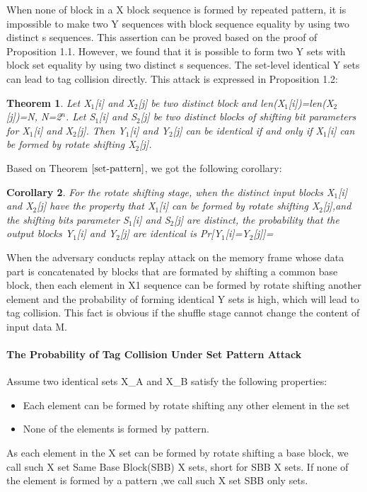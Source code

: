 \documentclass{article}
\newtheorem{theorem}{Theorem}[section]
\newtheorem{corollary}[theorem]{Corollary}
\begin{document}
When none of block in a X block sequence is formed by repeated pattern, it is impossible to make two Y sequences with block sequence equality by using two distinct s sequences. This assertion can be proved based on the proof of Proposition 1.1. However, we found that it is possible to form two Y sets with block set equality by using two distinct s sequences. The set-level identical Y sets can lead to tag collision directly. This attack is expressed in Proposition 1.2:
\begin{theorem}
Let X$_1$[i] and X$_2$[j] be two distinct block and len(X$_1$[i])=len(X$_2$[j])=N, N=2$^n$. Let S$_1$[i] and S$_2$[j] be two distinct blocks of shifting bit parameters for X$_1$[i] and X$_2$[j].
Then Y$_1$[i] and Y$_2$[j] can be identical if and only if X$_1$[i] can be formed by rotate shifting X$_2$[j].
\label{set-pattern}
\end{theorem}
Based on Theorem $\ref{set-pattern}$, we got the following corollary:
\begin{corollary}
For the rotate shifting stage, when the distinct input blocks X$_1$[i] and X$_2$[j] have the property that X$_1$[i] can be formed by rotate shifting X$_2$[j],and the shifting bits parameter S$_1$[i] and S$_2$[j] are distinct, the probability that the output blocks Y$_1$[i] and Y$_2$[j] are identical is Pr[Y$_1$[i]=Y$_2$[j]]=
\end{corollary}
 When the adversary conducts replay attack on the memory frame whose data part
is concatenated by blocks that are formated by shifting a common base block,
then each element in X1 sequence can be formed by rotate shifting another
element and the probability of forming identical Y sets is high, which will lead
to tag collision. This fact is obvious if the shuffle stage cannot change the
content of input data M.

\paragraph{The Probability of Tag Collision Under Set Pattern Attack}
Assume two identical sets X\_A and X\_B satisfy the following properties:
\begin{itemize}
	\item Each element can be formed by rotate shifting any other element in the set
	\item None of the elements is formed by pattern.
\end{itemize}
As each element in the X set can be formed by rotate shifting a base block, we call such X set Same Base Block(SBB) X sets, short for SBB X sets. If none of the element is formed by a pattern ,we call such X set SBB only sets.
\end{document}
